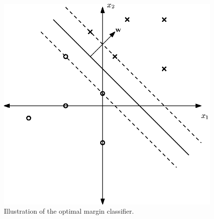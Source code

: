 \begin{figure}[h!]
	\centering
		\includegraphics{drawings/svm.eps}
	\caption{Illustration of the optimal margin classifier.}
	\label{fig:svm}
\end{figure}

